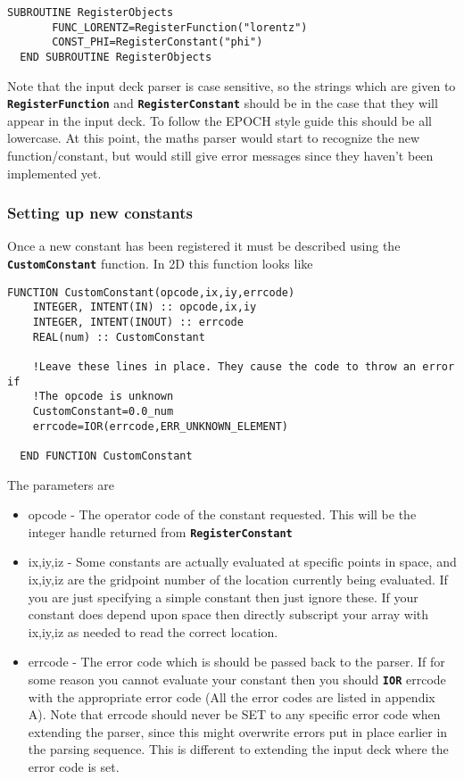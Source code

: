 \documentclass[12pt]{article}
\newcommand{\simpleboxverbatim}{\begin{Verbatim}[obeytabs=true,frame=single,
  framerule=0.5mm,rulecolor=\color{warwickmid}]}
\newcommand{\inlinecode}[1]{{\color{warwickred} \bf\texttt{#1}}}
\newcommand{\nEPOCH}{{\color{warwickdark}\fontfamily{phv}\selectfont EPOCH}}
\newcommand{\EPOCH}{{\nEPOCH} }
\begin{document}
\simpleboxverbatim
  SUBROUTINE RegisterObjects
       FUNC_LORENTZ=RegisterFunction("lorentz")
       CONST_PHI=RegisterConstant("phi")
  END SUBROUTINE RegisterObjects
\end{Verbatim}

Note that the input deck parser is case sensitive, so the strings which are
given to \inlinecode{RegisterFunction} and \inlinecode{RegisterConstant}
should be in the case that they will appear in the input deck. To follow the
\EPOCH style guide this should be all lowercase. At this point, the maths
parser would start to recognize the new function/constant, but would still
give error messages since they haven't been implemented yet.

\subsubsection{Setting up new constants}

Once a new constant has been registered it must be described using the
\inlinecode{CustomConstant} function. In 2D this function looks like

\simpleboxverbatim
  FUNCTION CustomConstant(opcode,ix,iy,errcode)
    INTEGER, INTENT(IN) :: opcode,ix,iy
    INTEGER, INTENT(INOUT) :: errcode
    REAL(num) :: CustomConstant

    !Leave these lines in place. They cause the code to throw an error if
    !The opcode is unknown
    CustomConstant=0.0_num
    errcode=IOR(errcode,ERR_UNKNOWN_ELEMENT)

  END FUNCTION CustomConstant
\end{Verbatim}

The parameters are

\begin{itemize}
\item opcode - The operator code of the constant requested. This will be the
  integer handle returned from \inlinecode{RegisterConstant}
\item ix,iy,iz - Some constants are actually evaluated at specific points in
  space, and ix,iy,iz are the gridpoint number of the location currently being
  evaluated. If you are just specifying a simple constant then just ignore
  these. If your constant does depend upon space then directly subscript your
  array with ix,iy,iz as needed to read the correct location.
\item errcode - The error code which is should be passed back to the
  parser. If for some reason you cannot evaluate your constant then you should
  \inlinecode{IOR} errcode with the appropriate error code (All the error
  codes are listed in appendix A). Note that errcode should never be SET to
  any specific error code when extending the parser, since this might
  overwrite errors put in place earlier in the parsing sequence. This is
  different to extending the input deck where the error code is set.
\end{itemize}
\end{document}
